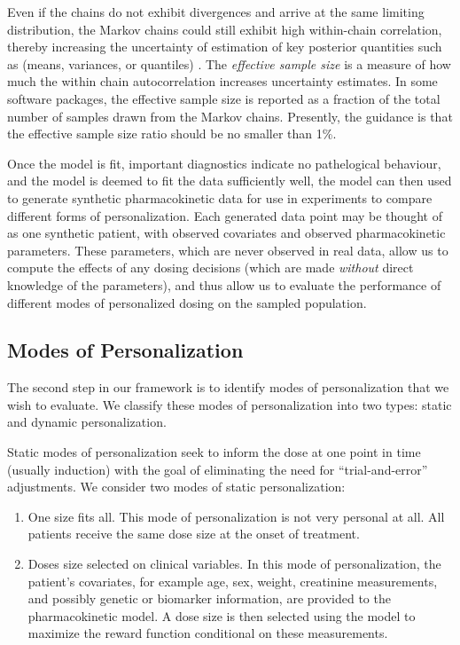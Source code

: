 Even if the chains do not exhibit divergences and arrive at the same limiting distribution, the Markov chains could still exhibit high within-chain correlation, thereby increasing the uncertainty of estimation of key posterior quantities such as (means, variances, or quantiles) \cite{brooks2011handbook}.  The \textit{effective sample size} is a measure of how much the within chain autocorrelation increases uncertainty estimates.  In some software packages, the effective sample size is reported as a fraction of the total number of samples drawn from the Markov chains.  Presently, the guidance is that the effective sample size ratio should be no smaller than 1\%.

Once the model is fit, important diagnostics indicate no pathelogical behaviour, and the model is deemed to fit the data sufficiently well, the model can then used to generate synthetic pharmacokinetic data for use in experiments to compare different forms of personalization. Each generated data point may be thought of as one synthetic patient, with observed covariates and observed pharmacokinetic parameters. These parameters, which are never observed in real data, allow us to compute the effects of any dosing decisions (which are made \textit{without} direct knowledge of the parameters), and thus allow us to evaluate the performance of different modes of personalized dosing on the sampled population. 

\subsection{Modes of Personalization}

The second step in our framework is to identify modes of personalization that we wish to evaluate. We classify these modes of personalization into two types: static and dynamic personalization.

Static modes of personalization seek to inform the dose at one point in time (usually induction) with the goal of eliminating the need for ``trial-and-error'' adjustments.  We consider two modes of static personalization:

\begin{enumerate}
	\item One size fits all.  This mode of personalization is not very personal at all.  All patients receive the same dose size at the onset of treatment.
	\item Doses size selected on clinical variables.  In this mode of personalization, the patient's covariates, for example age, sex, weight, creatinine measurements, and possibly genetic or biomarker information, are provided to the pharmacokinetic model.  A dose size is then selected using the model to maximize the reward function conditional on these measurements.
\end{enumerate}

